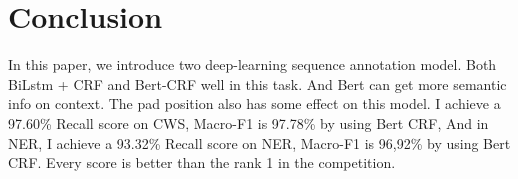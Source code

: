 \section{Conclusion}
\label{sec:Conclusion}
In this paper, we introduce two deep-learning sequence annotation model. Both BiLstm + CRF and Bert-CRF well in this task. And Bert can get more semantic info on context. The pad position also has some effect on this model. I achieve a 97.60\% Recall score on CWS,  Macro-F1 is 97.78\% by using Bert CRF, And in NER,  I achieve a 93.32\% Recall score on NER,  Macro-F1 is 96,92\% by using Bert CRF. Every score is better than the rank 1 in the competition. 